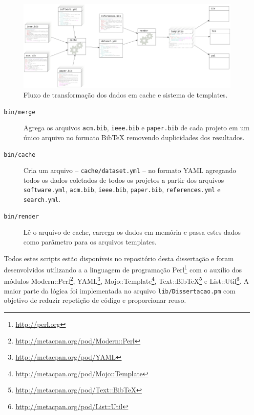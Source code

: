 \begin{figure}[h]
  \center
  \includegraphics[scale=0.3]{imagens/templates.png}
  \caption{Fluxo de transformação dos dados em cache e sistema de templates.}
  \label{templates}
\end{figure}


\begin{description}

  \item[\texttt{bin/merge}]
    Agrega os arquivos \texttt{acm.bib}, \texttt{ieee.bib} e \texttt{paper.bib}
    de cada projeto em um único arquivo no formato BibTeX removendo
    duplicidades dos resultados.

  \item[\texttt{bin/cache}]
    Cria um arquivo -- \texttt{cache/dataset.yml} -- no formato YAML agregando todos os dados coletados de todos
    os projetos a partir dos arquivos \texttt{software.yml}, \texttt{acm.bib},
    \texttt{ieee.bib}, \texttt{paper.bib}, \texttt{references.yml} e
    \texttt{search.yml}.

  \item[\texttt{bin/render}]
    Lê o arquivo de cache, carrega os dados em memória e passa estes dados como
    parâmetro para os arquivos templates.

\end{description}

Todos estes scripts estão disponíveis no repositório desta dissertação e foram desenvolvidos
utilizando a a linguagem de
programação Perl\footnote{\url{http://perl.org}} com o auxílio dos
módulos Modern::Perl\footnote{\url{http://metacpan.org/pod/Modern::Perl}},
YAML\footnote{\url{http://metacpan.org/pod/YAML}},
Mojo::Template\footnote{\url{http://metacpan.org/pod/Mojo::Template}},
Text::BibTeX\footnote{\url{http://metacpan.org/pod/Text::BibTeX}} e
List::Util\footnote{\url{http://metacpan.org/pod/List::Util}}.
A maior parte da lógica foi implementada no arquivo
\texttt{lib/Dissertacao.pm} com objetivo de reduzir repetição de código e
proporcionar reuso.

